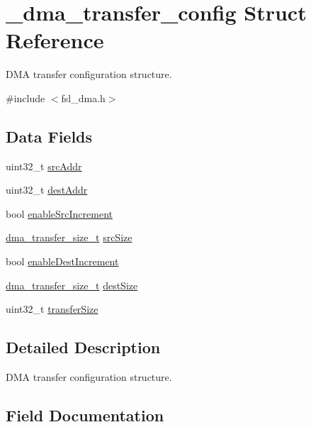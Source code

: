 \hypertarget{struct__dma__transfer__config}{}\section{\+\_\+dma\+\_\+transfer\+\_\+config Struct Reference}
\label{struct__dma__transfer__config}


D\+MA transfer configuration structure.  




{\ttfamily \#include $<$fsl\+\_\+dma.\+h$>$}

\subsection*{Data Fields}
\begin{DoxyCompactItemize}
\item 
uint32\+\_\+t \mbox{\hyperlink{struct__dma__transfer__config_a0bf5e6a7c94ddbf20e5f713150a87da5}{src\+Addr}}
\item 
uint32\+\_\+t \mbox{\hyperlink{struct__dma__transfer__config_a85878efbcf880897d05fb1aa24c28a65}{dest\+Addr}}
\item 
bool \mbox{\hyperlink{struct__dma__transfer__config_a6c1674abe77cd98be4d299fff7f4c003}{enable\+Src\+Increment}}
\item 
\mbox{\hyperlink{group__dma_ga77280b3fae0e8ee447666e14c101dfe0}{dma\+\_\+transfer\+\_\+size\+\_\+t}} \mbox{\hyperlink{struct__dma__transfer__config_a60bfcc72290b71d1cdda387f1a7c2dac}{src\+Size}}
\item 
bool \mbox{\hyperlink{struct__dma__transfer__config_a04bbb581a96c3f138251ab5078ba1364}{enable\+Dest\+Increment}}
\item 
\mbox{\hyperlink{group__dma_ga77280b3fae0e8ee447666e14c101dfe0}{dma\+\_\+transfer\+\_\+size\+\_\+t}} \mbox{\hyperlink{struct__dma__transfer__config_af8d1279c087851c3058f0981857d0242}{dest\+Size}}
\item 
uint32\+\_\+t \mbox{\hyperlink{struct__dma__transfer__config_a6feb07da81f2cb170eabc3d00565d404}{transfer\+Size}}
\end{DoxyCompactItemize}


\subsection{Detailed Description}
D\+MA transfer configuration structure. 

\subsection{Field Documentation}
\mbox{\label{struct__dma__transfer__config_a85878efbcf880897d05fb1aa24c28a65}} 
